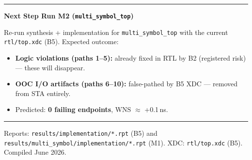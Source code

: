 \documentclass[10pt,a4paper]{article}
\newcommand{\sectionrule}{\vspace{2pt}\textcolor{rulegray}{\rule{\linewidth}{0.8pt}}\vspace{2pt}}
\begin{document}
\sectionrule

{\large\bfseries\color{hdrblue} Next Step \textendash{} Run M2 (\texttt{multi\_symbol\_top})}

\vspace{4pt}
Re-run synthesis + implementation for \texttt{multi\_symbol\_top} with the current
\texttt{rtl/top.xdc} (B5). Expected outcome:

\begin{itemize}[leftmargin=1.2em, itemsep=2pt]
  \item \textbf{Logic violations (paths 1--5):} already fixed in RTL by B2
        (registered risk) — these will disappear.
  \item \textbf{OOC I/O artifacts (paths 6--10):} false-pathed by B5 XDC —
        removed from STA entirely.
  \item Predicted: \textbf{0 failing endpoints}, WNS $\approx$ +0.1\,ns.
\end{itemize}

\vfill
\textcolor{rulegray}{\rule{\linewidth}{0.5pt}}
{\footnotesize\color{rulegray}
Reports: \texttt{results/implementation/*.rpt} (B5) and
\texttt{results/multi\_symbol/implementation/*.rpt} (M1).
XDC: \texttt{rtl/top.xdc} (B5). Compiled June 2026.}
\end{document}
